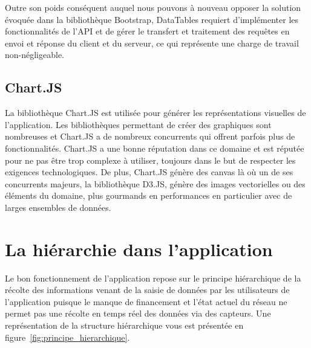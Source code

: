 \documentclass{EPL-master-thesis-covers-FR}
\begin{document}
				Outre son poids conséquent auquel nous pouvons à nouveau opposer la solution évoquée dans la bibliothèque Bootstrap, DataTables requiert d'implémenter les fonctionnalités de l'API et de gérer le transfert et traitement des requêtes en envoi et réponse du client et du serveur, ce qui représente une charge de travail non-négligeable.

			\subsection*{Chart.JS}

				La bibliothèque Chart.JS est utilisée pour générer les représentations visuelles de l'application. Les bibliothèques permettant de créer des graphiques sont nombreuses et Chart.JS a de nombreux concurrents qui offrent parfois plus de fonctionnalités. Chart.JS a une bonne réputation dans ce domaine et est réputée pour ne pas être trop complexe à utiliser, toujours dans le but de respecter les exigences technologiques.
				De plus, Chart.JS génère des canvas là où un de ses concurrents majeurs, la bibliothèque D3.JS, génère des images vectorielles ou des éléments du domaine, plus gourmands en performances en particulier avec de larges ensembles de données.

		\section{La hiérarchie dans l'application}

			Le bon fonctionnement de l'application repose sur le principe hiérarchique de la récolte des informations venant de la saisie de données par les utilisateurs de l'application puisque le manque de financement et l'état actuel du réseau ne permet pas une récolte en temps réel des données via des capteurs. Une représentation de la structure hiérarchique vous est présentée en figure~\ref{fig:principe_hierarchique}.
\end{document}

